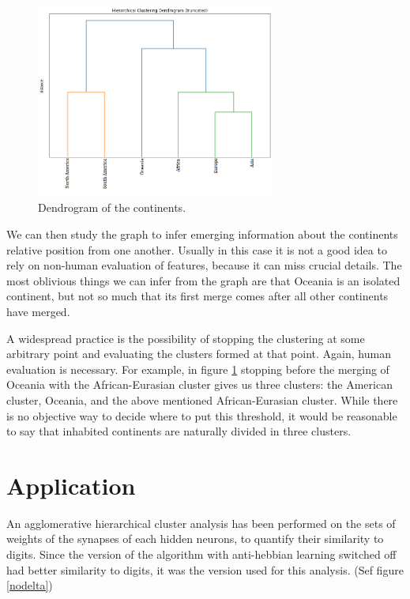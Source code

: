 \documentclass[a4paper]{report}
\begin{document}
\begin{figure} [H]
\centering
\includegraphics [width=0.7\textwidth] {o/continents.png}
\caption{Dendrogram of the continents.}
\label{conte}
\end{figure}

We can then study the graph to infer emerging information about the continents relative position from one another. Usually in this case it is not a good idea to rely on non-human evaluation of features, because it can miss crucial details. The most oblivious things we can infer from the graph are that Oceania is an isolated continent, but not so much that its first merge comes after all other continents have merged.

A widespread practice is the possibility of stopping the clustering at some arbitrary point and evaluating the clusters formed at that point. Again, human evaluation is necessary. For example, in figure \ref{conte} stopping before the merging of Oceania with the African-Eurasian cluster gives us three clusters: the American cluster, Oceania, and the above mentioned African-Eurasian cluster. While there is no objective way to decide where to put this threshold, it would be reasonable to say that inhabited continents are naturally divided in three clusters.

\section{Application}

An agglomerative hierarchical cluster analysis has been performed on the sets of weights of the synapses of each hidden neurons, to quantify their similarity to digits. Since the version of the algorithm with anti-hebbian learning switched off had better similarity to digits, it was the version used for this analysis. (Sef figure \ref{nodelta})
\end{document}
